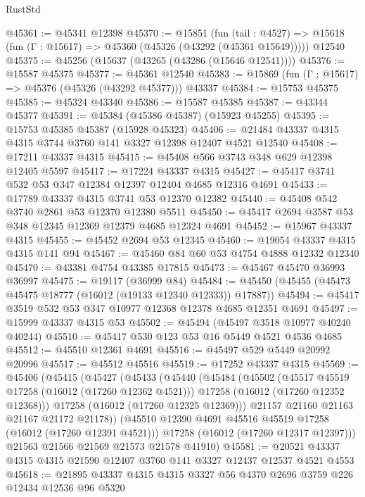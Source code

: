 \begin{lexlean}{RustStd}
\begin{coremodule}
@45361 := @45341 @12398
@45370 := @15851
    (fun (tail : @4527) => @15618 (fun (Γ : @15617) => @45360 (@45326 (@43292 (@45361 @15649)))))
    @12540
@45375 := @45256 (@15637 (@43265 (@43286 (@15646 @12541))))
@45376 := @15587 @45375
@45377 := @45361 @12540
@45383 := @15869 (fun (Γ : @15617) => @45376 (@45326 (@43292 @45377))) @43337
@45384 := @15753 @45375
@45385 := @45324 @43340
@45386 := @15587 @45385
@45387 := @43344 @45377
@45391 := @45384 (@45386 @45387) (@15923 @45255)
@45395 := @15753 @45385 @45387 (@15928 @45323)
@45406 := @21484 @43337 @4315 @4315 @3744 @3760 @141 @3327 @12398 @12407 @4521 @12540
@45408 := @17211 @43337 @4315
@45415 := @45408 @566 @3743 @348 @629 @12398 @12405 @5597
@45417 := @17224 @43337 @4315
@45427 := @45417 @3741 @532 @53 @347 @12384 @12397 @12404 @4685 @12316 @4691
@45433 := @17789 @43337 @4315 @3741 @53 @12370 @12382
@45440 := @45408 @542 @3740 @2861 @53 @12370 @12380 @5511
@45450 := @45417 @2694 @3587 @53 @348 @12345 @12369 @12379 @4685 @12324 @4691
@45452 := @15967 @43337 @4315
@45455 := @45452 @2694 @53 @12345
@45460 := @19054 @43337 @4315 @4315 @141 @94
@45467 := @45460 @84 @60 @53 @4754 @4888 @12332 @12340
@45470 := @43381 @4754 @43385 @17815
@45473 := @45467 @45470 @36993 @36997
@45475 := @19117 (@36999 @84)
@45484 := @45450 (@45455 (@45473 @45475 @18777 (@16012 (@19133 @12340 @12333)) @17887))
@45494 := @45417 @3519 @532 @53 @347 @10977 @12368 @12378 @4685 @12351 @4691
@45497 := @15999 @43337 @4315 @53
@45502 := @45494 (@45497 @3518 @10977 @40240 @40244)
@45510 := @45417 @530 @123 @53 @16 @5449 @4521 @4536 @4685
@45512 := @45510 @12361 @4691
@45516 := @45497 @529 @5449 @20992 @20996
@45517 := @45512 @45516
@45519 := @17252 @43337 @4315
@45569 := @45406
    (@45415
      (@45427
        (@45433
          (@45440
            (@45484
              (@45502
                (@45517 @45519 @17258 (@16012 (@17260 @12362 @4521)))
                @17258
                (@16012 (@17260 @12352 @12368)))
              @17258
              (@16012 (@17260 @12325 @12369)))
            @21157
            @21160
            @21163
            @21167
            @21172
            @21178))
        (@45510 @12390 @4691 @45516 @45519 @17258 (@16012 (@17260 @12391 @4521)))
        @17258
        (@16012 (@17260 @12317 @12397)))
      @21563
      @21566
      @21569
      @21573
      @21578
      @41910)
@45581 := @20521 @43337 @4315 @4315 @21590 @12407 @3760 @141 @3327 @12437 @12537 @4521 @4553
@45618 := @21895
    @43337
    @4315
    @4315
    @3327
    @56
    @4370
    @2696
    @3759
    @226
    @12434
    @12536
    @96
    @5320

\end{coremodule}
\end{lexlean}
